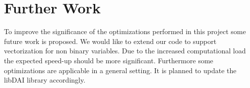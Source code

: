 \section{Further Work}
To improve the significance of the optimizations performed in this project some future work is proposed. We would like to extend our code to support vectorization for non binary variables. Due to the increased computational load the expected speed-up should be more significant. Furthermore some optimizations are applicable in a general setting. It is planned to update the libDAI library accordingly.
